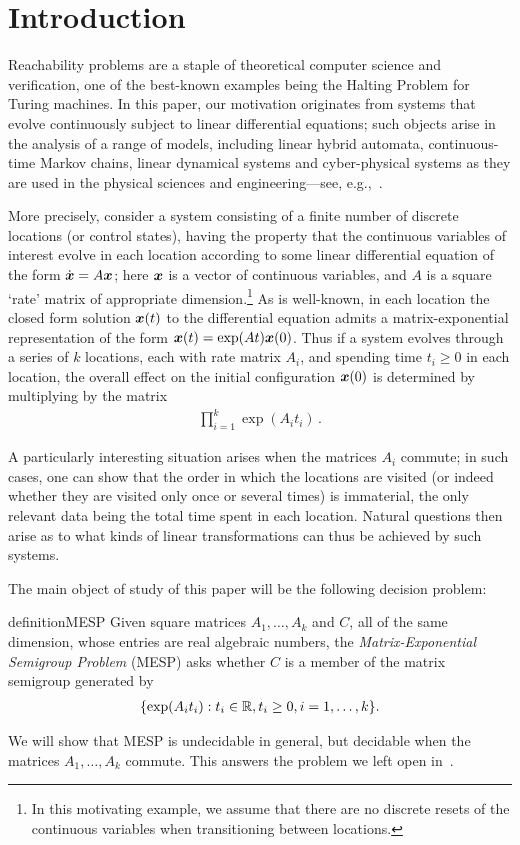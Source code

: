 \section{Introduction}

Reachability problems are a staple of theoretical computer
science and verification, one of the best-known examples being the
Halting Problem for Turing machines. In this paper, our motivation
originates from systems that evolve continuously subject to linear
differential equations; such objects arise in the analysis of a range
of models, including linear hybrid automata, continuous-time Markov
chains, linear dynamical systems and cyber-physical systems as they
are used in the physical sciences and engineering---see,
e.g.,~\cite{Alu15}.

More precisely, consider a system consisting of a finite number of
discrete locations (or control states), having the property that the
continuous variables of interest evolve in each location according to
some linear differential equation of the form $\dot{\boldsymbol{x}} = A
\boldsymbol{x}$; here $\boldsymbol{x}$ is a vector of continuous
variables, and $A$ is a square `rate' matrix of appropriate
dimension.\footnote{In
  this motivating example, we assume that there are no discrete
  resets of the continuous variables when transitioning between
  locations.}
As is well-known, in each location the closed form solution
$\boldsymbol{x}(t)$ to the differential equation admits a
matrix-exponential representation of the form $\boldsymbol{x}(t) =
\exp(At)\boldsymbol{x}(0)$. Thus if a system evolves through a series
of $k$ locations, each with rate matrix $A_i$, and spending time $t_i
\geq 0$ in each location, the overall effect on the initial
configuration $\boldsymbol{x}(0)$ is determined by multiplying by the matrix
\begin{align*}
\prod \limits_{i=1}^{k} \exp(A_{i} t_{i}) \, .
\end{align*}

A particularly interesting situation arises when the matrices $A_i$
commute; in such cases, one can show that the order in which the
locations are visited (or indeed whether they are visited only once or
several times) is immaterial, the only relevant data being the total
time spent in each location. Natural questions then arise as to what
kinds of linear transformations can thus be achieved by such systems.

The main object of study of this paper will be the following decision problem:
\begin{restatable}{definition}{MESP}
\label{def:MESP}
Given square matrices $A_{1}, \ldots, A_{k}$ and $C$, all of the same
dimension, whose entries are real algebraic numbers, the
\emph{Matrix-Exponential Semigroup Problem} (MESP) asks
whether $C$ is a member of the matrix semigroup generated by
\begin{align*}
    \lbrace \exp(A_{i} t_{i}) : t_{i} \in \mathbb{R}, t_{i} \geq 0, i=1,\ldots,k \rbrace.
\end{align*}
\end{restatable}
We will show that MESP is undecidable in general, but decidable when the matrices $A_{1}, \ldots, A_{k}$ commute.
This answers the problem we left open in~\cite{LICS16}.

